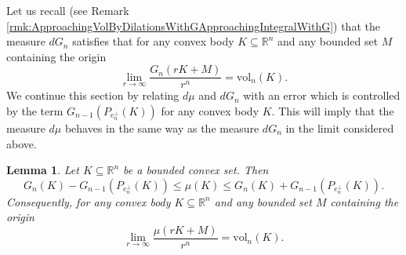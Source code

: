 \documentclass[10pt]{amsart}
\newtheorem{lemma}[thm]{Lemma}
\def\R{\mathbb{R}}
\def\vol{\mathrm{vol}}
\numberwithin{equation}{section}
\begin{document}
Let us recall (see Remark \ref{rmk:ApproachingVolByDilationsWithGApproachingIntegralWithG}) that the measure $dG_n$ satisfies that for any convex body $K\subseteq\R^n$ and any bounded set $M$ containing the origin
$$
\lim_{r\to\infty}\frac{G_n(rK+M)}{r^n}=\vol_n(K).
$$
We continue this section by relating $d\mu$ and $dG_n$ with an error which is controlled by the term $G_{n-1}(P_{e_n^\perp}(K))$ for any convex body $K$. This will imply that the measure $d\mu$ behaves in the same way as the measure $dG_n$ in the limit considered above.

\begin{lemma}\label{lem:muyGn}
Let $K\subseteq\R^n$ be a bounded convex set. Then
$$
G_n(K)-G_{n-1}(P_{e_n^\perp}(K))\leq\mu(K)\leq G_n(K)+G_{n-1}(P_{e_n^\perp}(K)).
$$
Consequently, for any convex body $K\subseteq\R^n$ and any bounded set $M$ containing the origin
$$
\lim_{r\to\infty}\frac{\mu(rK+M)}{r^n}=\vol_n(K).
$$
\end{lemma}
\end{document}

